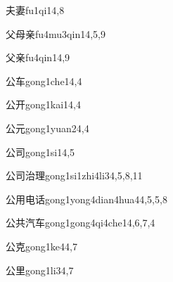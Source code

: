 \begin{verbete}{夫妻}{fu1qi1}{4,8}
\end{verbete}

\begin{verbete}{父母亲}{fu4mu3qin1}{4,5,9}
\end{verbete}

\begin{verbete}{父亲}{fu4qin1}{4,9}
\end{verbete}

\begin{verbete}{公车}{gong1che1}{4,4}
\end{verbete}

\begin{verbete}{公开}{gong1kai1}{4,4}
\end{verbete}

\begin{verbete}{公元}{gong1yuan2}{4,4}
\end{verbete}

\begin{verbete}{公司}{gong1si1}{4,5}
\end{verbete}

\begin{verbete}{公司治理}{gong1si1zhi4li3}{4,5,8,11}
\end{verbete}

\begin{verbete}{公用电话}{gong1yong4dian4hua4}{4,5,5,8}
\end{verbete}

\begin{verbete}{公共汽车}{gong1gong4qi4che1}{4,6,7,4}
\end{verbete}

\begin{verbete}{公克}{gong1ke4}{4,7}
\end{verbete}

\begin{verbete}{公里}{gong1li3}{4,7}
\end{verbete}

